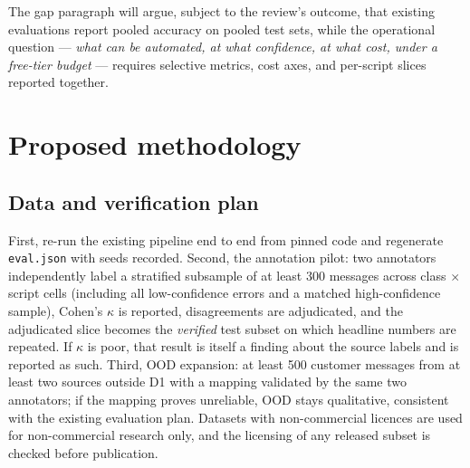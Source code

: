 \documentclass[11pt]{article}
\begin{document}
The gap paragraph will argue, subject to the review's outcome, that existing
evaluations report pooled accuracy on pooled test sets, while the operational
question --- \emph{what can be automated, at what confidence, at what cost,
under a free-tier budget} --- requires selective metrics, cost axes, and
per-script slices reported together.

\section{Proposed methodology}
\subsection{Data and verification plan}
First, re-run the existing pipeline end to end from pinned code and regenerate
\texttt{eval.json} with seeds recorded. Second, the annotation pilot: two
annotators independently label a stratified subsample of at least 300 messages
across class $\times$ script cells (including all low-confidence errors and a
matched high-confidence sample), Cohen's $\kappa$ is reported, disagreements
are adjudicated, and the adjudicated slice becomes the \emph{verified} test
subset on which headline numbers are repeated. If $\kappa$ is poor, that
result is itself a finding about the source labels and is reported as such.
Third, OOD expansion: at least 500 customer messages from at least two
sources outside D1 with a mapping validated by the same two annotators; if the
mapping proves unreliable, OOD stays qualitative, consistent with the existing
evaluation plan. Datasets with non-commercial licences are used for
non-commercial research only, and the licensing of any released subset is
checked before publication.
\end{document}
